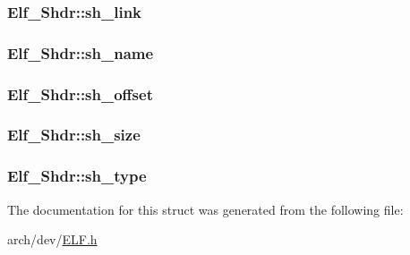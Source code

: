 \hypertarget{struct_elf___shdr_a15bcce9ee8927454d8051bd6cd1f6d6c}{
\subsubsection[{sh\+\_\+link}]{ Elf\+\_\+\+Shdr\+::sh\+\_\+link}}\label{struct_elf___shdr_a15bcce9ee8927454d8051bd6cd1f6d6c}
\hypertarget{struct_elf___shdr_a4f628f4a31a0d3b65b1333707ec7a41e}{
\subsubsection[{sh\+\_\+name}]{ Elf\+\_\+\+Shdr\+::sh\+\_\+name}}\label{struct_elf___shdr_a4f628f4a31a0d3b65b1333707ec7a41e}
\hypertarget{struct_elf___shdr_a477af45ae125aabc9004bc22cca9f359}{
\subsubsection[{sh\+\_\+offset}]{ Elf\+\_\+\+Shdr\+::sh\+\_\+offset}}\label{struct_elf___shdr_a477af45ae125aabc9004bc22cca9f359}
\hypertarget{struct_elf___shdr_ab91fe55a6d4d7dfdda120357ba718924}{
\subsubsection[{sh\+\_\+size}]{ Elf\+\_\+\+Shdr\+::sh\+\_\+size}}\label{struct_elf___shdr_ab91fe55a6d4d7dfdda120357ba718924}
\hypertarget{struct_elf___shdr_afc12886fbfa0ea8fc0fde5d1dbf706bb}{
\subsubsection[{sh\+\_\+type}]{ Elf\+\_\+\+Shdr\+::sh\+\_\+type}}\label{struct_elf___shdr_afc12886fbfa0ea8fc0fde5d1dbf706bb}


The documentation for this struct was generated from the following file\+:\begin{DoxyCompactItemize}
\item 
arch/dev/\hyperlink{_e_l_f_8h}{E\+L\+F.\+h}\end{DoxyCompactItemize}
